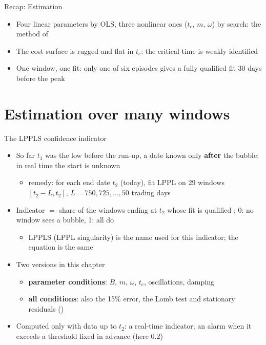 \begin{frame}{Recap: Estimation}
\itemsize{\small}
\begin{itemize}
    \item Four linear parameters by OLS, three nonlinear ones ($t_c$, $m$, $\omega$) by search: the method of 
    \item The cost surface is rugged and flat in $t_c$: the critical time is weakly identified
    \item One window, one fit: only one of six episodes gives a fully qualified fit 30 days before the peak
\end{itemize}
\end{frame}


\section{Estimation over many windows}

\begin{frame}{The LPPLS confidence indicator}
\itemsize{\small}
\begin{itemize}
    \item So far $t_1$ was the low before the run-up, a date known only \textbf{after} the bubble; in real time the start is unknown
    \begin{itemize}
        \item remedy: for each end date $t_2$ (today), fit LPPL on 29 windows $[t_2 - L, t_2]$, $L = 750, 725, \dots, 50$ trading days 
    \end{itemize}
    \item Indicator $=$ share of the windows ending at $t_2$ whose fit is qualified ; 0: no window sees a bubble, 1: all do
    \begin{itemize}
        \item LPPLS (LPPL singularity) is the name used for this indicator; the equation is the same
    \end{itemize}
    \item Two versions in this chapter
    \begin{itemize}
        \item \textbf{parameter conditions}: $B$, $m$, $\omega$, $t_c$, oscillations, damping
        \item \textbf{all conditions}: also the 15\% error, the Lomb test and stationary residuals ()
    \end{itemize}
    \item Computed only with data up to $t_2$: a real-time indicator; an alarm when it exceeds a threshold fixed in advance (here 0.2)
\end{itemize}
\end{frame}

